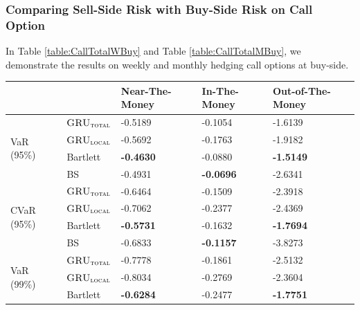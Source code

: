\documentclass[letterpaper,12pt,titlepage,oneside,final]{book}
\numberwithin{equation}{section}
\theoremstyle{definition}
\newcommand{\modelT}{\textsc{GRU}_{\textsc{total}}}
\newcommand{\modelL}{\textsc{GRU}_{\textsc{local}}}
\begin{document}
\subsubsection{Comparing Sell-Side Risk with Buy-Side Risk on Call Option}
In Table \ref{table:CallTotalWBuy} and  Table \ref{table:CallTotalMBuy},  we demonstrate the results on weekly and monthly hedging call options at buy-side.
\begin{table}[htp!]
	\centering
	\begin{tabular}{ll|l|l|l|}
		\cline{3-5}
		&          & Near-The-Money   & In-The-Money     & Out-of-The-Money \\ \hline
		\multicolumn{1}{|l|}{\multirow{4}{*}{VaR (95\%)}}     & $\modelT$     & -0.5189          & -0.1054 					 & -1.6139  \\  
		\multicolumn{1}{|l|}{}                                & $\modelL$     & -0.5692          & -0.1763          		 & -1.9182           \\  
		\multicolumn{1}{|l|}{}                                & Bartlett      & \textbf{-0.4630} & -0.0880          		 & \textbf{-1.5149}           \\  
		\multicolumn{1}{|l|}{}                                & BS            & -0.4931          & \textbf{-0.0696}          & -2.6341           \\ 
		\hline
		\multicolumn{1}{|l|}{\multirow{4}{*}{CVaR (95\%)}}    & $\modelT$     & -0.6464 		 & -0.1509 					 & -2.3918  \\  
		\multicolumn{1}{|l|}{}                                & $\modelL$     & -0.7062          & -0.2377          		 & -2.4369          \\  
		\multicolumn{1}{|l|}{}                                & Bartlett      & \textbf{-0.5731} & -0.1632          		 & \textbf{-1.7694}          \\  
		\multicolumn{1}{|l|}{}                                & BS            & -0.6833          & \textbf{-0.1157}          & -3.8273           \\ 
		\hline
		\multicolumn{1}{|l|}{\multirow{4}{*}{VaR (99\%)}}     & $\modelT$     & -0.7778 		 & -0.1861 					 & -2.5132           \\  
		\multicolumn{1}{|l|}{}                                & $\modelL$     & -0.8034          & -0.2769          		 & -2.3604           \\  
		\multicolumn{1}{|l|}{}                                & Bartlett      & \textbf{-0.6284} & -0.2477          		 & \textbf{-1.7751}           \\  

\end{tabular}
\end{table}
\end{document}
